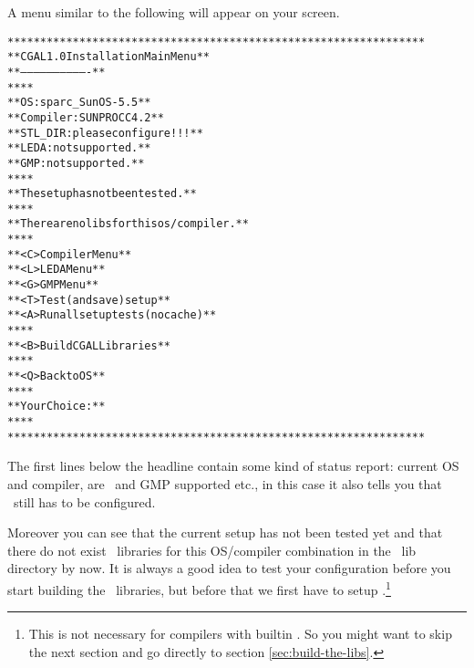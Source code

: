 A menu similar to the following will appear on your screen.

\begin{scriptsize}\label{pic:main-menu}
\begin{alltt}
  ****************************************************************
  **              CGAL 1.0 Installation Main Menu               **
  **              -------------------------------               **
  **                                                            **
  **   OS:                  sparc_SunOS-5.5                     **
  **   Compiler:            SUNPRO CC 4.2                       **
  **   STL_DIR:             please configure!!!                 **
  **   LEDA:                not supported.                      **
  **   GMP:                 not supported.                      **
  **                                                            **
  **   The setup has not been tested.                           **
  **                                                            **
  **   There are no libs for this os/compiler.                  **
  **                                                            **
  **   <C>  Compiler Menu                                       **
  **   <L>  LEDA Menu                                           **
  **   <G>  GMP Menu                                            **
  **   <T>  Test (and save) setup                               **
  **   <A>  Run all setup tests (no cache)                      **
  **                                                            **
  **   <B>  Build CGAL Libraries                                **
  **                                                            **
  **   <Q>  Back to OS                                          **
  **                                                            **
  **   Your Choice:                                             **
  **                                                            **
  ****************************************************************
\end{alltt}
\end{scriptsize}

The first lines below the headline contain some kind of status report:
current OS and compiler, are \leda\ and GMP supported etc., in this
case it also tells you that \stl\ still has to be configured.

Moreover you can see that the current setup has not been tested yet
and that there do not exist \cgal\ libraries for this OS/compiler
combination in the \cgal\ lib directory by now. It is always a good
idea to test your configuration before you start building the \cgal\ 
libraries, but before that we first have to setup \stl.\footnote{This
  is not necessary for compilers with builtin \stl. So you might want
  to skip the next section and go directly to section
  \ref{sec:build-the-libs}.}

